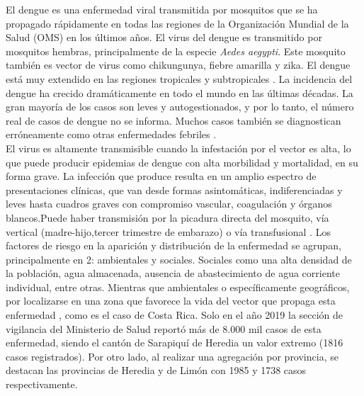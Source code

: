 \documentclass[12pt,a4paper]{article}
\begin{document}
El dengue es una enfermedad viral transmitida por mosquitos que se ha propagado rápidamente en todas las regiones de la Organización Mundial de la Salud (OMS) en los últimos años. El virus del dengue es transmitido por mosquitos hembras, principalmente de la especie \textit{Aedes aegypti}. Este mosquito también es vector de virus como chikungunya, fiebre amarilla y zika. El dengue está muy extendido en las regiones tropicales y subtropicales \cite{OMS}. La incidencia del dengue ha crecido dramáticamente en todo el mundo en las últimas décadas. La gran mayoría de los casos son leves y autogestionados, y por lo tanto, el número real de casos de dengue no se informa. Muchos casos también se diagnostican erróneamente como otras enfermedades febriles \cite{Waggoner2016}.\\
\newline
El virus es altamente transmisible cuando la infestación por el vector es alta, lo que puede producir epidemias de dengue con alta morbilidad y mortalidad, en su forma grave. La infección que produce resulta en un amplio espectro de presentaciones clínicas, que van desde formas asintomáticas, indiferenciadas y leves hasta cuadros graves con compromiso vascular, coagulación y órganos blancos.Puede haber transmisión por la picadura directa del mosquito, vía vertical (madre-hijo,tercer trimestre de embarazo) o vía transfusional \cite{CajaCostarricensedelSeguroSocial2013}.
\newline
Los factores de riesgo en la aparición y distribución de la enfermedad se agrupan, principalmente en 2: ambientales y sociales. Sociales como una alta densidad de la población, agua almacenada, ausencia de abastecimiento de agua corriente individual, entre otras. Mientras que ambientales o específicamente geográficos, por localizarse en una zona que favorece la vida del vector que propaga esta enfermedad \cite{factores}, como es el caso de Costa Rica. Solo en el año 2019 la sección de vigilancia del Ministerio de Salud reportó más de 8.000 mil casos de esta enfermedad, siendo el cantón de Sarapiquí de Heredia un valor extremo (1816 casos registrados). Por otro lado, al realizar una agregación por provincia, se destacan las provincias de Heredia y de Limón con 1985 y 1738 casos respectivamente. 
\newline
\end{document}

